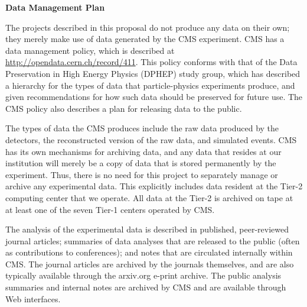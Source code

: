 \documentclass[11pt]{article}
\begin{document}
\begin{center}
{\large \bf Data Management Plan}\\
\end{center}

The projects described in this proposal do not produce any data on their own; they merely make use of data generated by the CMS experiment.  CMS has a data management policy, which is described at \url{http://opendata.cern.ch/record/411}.  This policy conforms with that of the Data Preservation in High Energy Physics (DPHEP) study group, which has described a hierarchy for the types of data that particle-physics experiments produce, and given recommendations for how such data should be preserved for future use.  The CMS policy also describes a plan for releasing data to the public.

The types of data the CMS produces include the raw data produced by the detectors, the reconstructed version of the raw data, and simulated events.  CMS has its own mechanisms for archiving data, and any data that resides at our institution will merely be a copy of data that is stored permanently by the experiment.  Thus, there is no need for this project to separately manage or archive any experimental data.  This explicitly includes data resident at the  Tier-2 computing center that we operate.  All data at the Tier-2 is archived on tape at at least one of the seven Tier-1 centers operated by CMS.

The analysis of the experimental data is described in published, peer-reviewed journal articles; summaries of data analyses that are released to the public (often as contributions to  conferences); and notes that are circulated internally within CMS. The journal articles are archived by the journals themselves, and are also typically available through the arxiv.org e-print archive. The public analysis summaries and internal notes are archived by CMS and are available through Web interfaces. 
\end{document}
